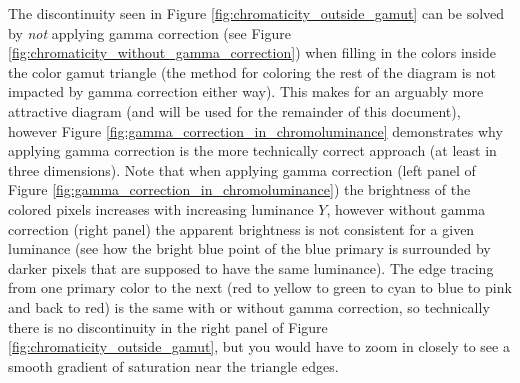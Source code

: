 \documentclass{article}
\begin{document}
\begin{multicols}{2}
The discontinuity seen in Figure \ref{fig:chromaticity_outside_gamut} can be solved by \textit{not} applying gamma correction (see Figure \ref{fig:chromaticity_without_gamma_correction}) when filling in the colors inside the color gamut triangle (the method for coloring the rest of the diagram is not impacted by gamma correction either way).  This makes for an arguably more attractive diagram (and will be used for the remainder of this document), however Figure \ref{fig:gamma_correction_in_chromoluminance} demonstrates why applying gamma correction is the more technically correct approach (at least in three dimensions).  Note that when applying gamma correction (left panel of Figure \ref{fig:gamma_correction_in_chromoluminance}) the brightness of the colored pixels increases with increasing luminance $Y$, however without gamma correction (right panel) the apparent brightness is not consistent for a given luminance (see how the bright blue point of the blue primary is surrounded by darker pixels that are supposed to have the same luminance).  The edge tracing from one primary color to the next (red to yellow to green to cyan to blue to pink and back to red) is the same with or without gamma correction, so technically there is no discontinuity in the right panel of Figure \ref{fig:chromaticity_outside_gamut}, but you would have to zoom in closely to see a smooth gradient of saturation near the triangle edges.


\end{multicols}
\end{document}
